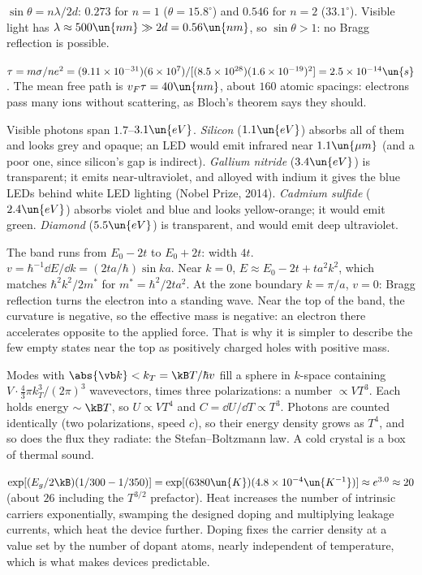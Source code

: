 
 $\sin\theta = n\lambda/2d$: $0.273$ for $n=1$ ($\theta = 15.8^\circ$) and $0.546$ for $n = 2$ ($33.1^\circ$). Visible light has $\lambda\approx500\un{nm}\gg2d = 0.56\un{nm}$, so $\sin\theta>1$: no Bragg reflection is possible.

 $\tau = m\sigma/ne^2 = (9.11\times10^{-31})(6\times10^7)/[(8.5\times10^{28})(1.6\times10^{-19})^2] = 2.5\times10^{-14}\un{s}$. The mean free path is $v_F\tau = 40\un{nm}$, about $160$ atomic spacings: electrons pass many ions without scattering, as Bloch's theorem says they should.

 Visible photons span $1.7$--$3.1\un{eV}$. \emph{Silicon} ($1.1\un{eV}$) absorbs all of them and looks grey and opaque; an LED would emit infrared near $1.1\un{\mu m}$ (and a poor one, since silicon's gap is indirect). \emph{Gallium nitride} ($3.4\un{eV}$) is transparent; it emits near-ultraviolet, and alloyed with indium it gives the blue LEDs behind white LED lighting (Nobel Prize, 2014). \emph{Cadmium sulfide} ($2.4\un{eV}$) absorbs violet and blue and looks yellow-orange; it would emit green. \emph{Diamond} ($5.5\un{eV}$) is transparent, and would emit deep ultraviolet.

 The band runs from $E_0-2t$ to $E_0+2t$: width $4t$. $v = \hbar^{-1}\dd E/\dd k = (2ta/\hbar)\sin ka$. Near $k = 0$, $E\approx E_0 - 2t + ta^2k^2$, which matches $\hbar^2k^2/2m^*$ for $m^* = \hbar^2/2ta^2$. At the zone boundary $k = \pi/a$, $v = 0$: Bragg reflection turns the electron into a standing wave. Near the top of the band, the curvature is negative, so the effective mass is negative: an electron there accelerates opposite to the applied force. That is why it is simpler to describe the few empty states near the top as positively charged holes with positive mass.

 Modes with $\abs{\vb k}<k_T = \kB T/\hbar v$ fill a sphere in $k$-space containing $V\cdot\tfrac43\pi k_T^3/(2\pi)^3$ wavevectors, times three polarizations: a number $\propto VT^3$. Each holds energy $\sim\kB T$, so $U\propto VT^4$ and $C = \dd U/\dd T\propto T^3$. Photons are counted identically (two polarizations, speed $c$), so their energy density grows as $T^4$, and so does the flux they radiate: the Stefan--Boltzmann law. A cold crystal is a box of thermal sound.

 $\exp[(E_g/2\kB)(1/300 - 1/350)] = \exp[(6380\un{K})(4.8\times10^{-4}\un{K^{-1}})]\approx e^{3.0}\approx20$ (about $26$ including the $T^{3/2}$ prefactor). Heat increases the number of intrinsic carriers exponentially, swamping the designed doping and multiplying leakage currents, which heat the device further. Doping fixes the carrier density at a value set by the number of dopant atoms, nearly independent of temperature, which is what makes devices predictable.

